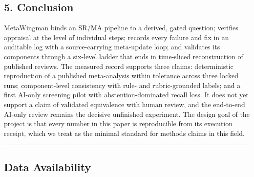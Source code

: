 \documentclass[
]{article}
\begin{document}
\subsection{5. Conclusion}\label{conclusion}

MetaWingman binds an SR/MA pipeline to a derived, gated question;
verifies appraisal at the level of individual steps; records every
failure and fix in an auditable log with a source-carrying meta-update
loop; and validates its components through a six-level ladder that ends
in time-sliced reconstruction of published reviews. The measured record
supports three claims: deterministic reproduction of a published
meta-analysis within tolerance across three locked runs; component-level
consistency with rule- and rubric-grounded labels; and a first AI-only
screening pilot with abstention-dominated recall loss. It does not yet
support a claim of validated equivalence with human review, and the
end-to-end AI-only review remains the decisive unfinished experiment.
The design goal of the project is that every number in this paper is
reproducible from its execution receipt, which we treat as the minimal
standard for methods claims in this field.

\begin{center}\rule{0.5\linewidth}{0.5pt}\end{center}

\subsection{Data Availability}\label{data-availability}
\end{document}
